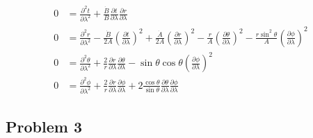 \begin{subequations}
    \begin{align}
        0 & = \frac{\partial^2 t}{\partial \lambda^2} +
        \frac{\dot{B}}{B}
        \frac{\partial t}{\partial \lambda}\frac{\partial r}{\partial \lambda}       \\
        0 & = \frac{\partial^2 r}{\partial \lambda^2} -
        \frac{\dot{B}}{2A}\left(\frac{\partial t}{\partial \lambda}\right)^2 +
        \frac{\dot{A}}{2A}\left(\frac{\partial r}{\partial \lambda}\right)^2 -
        \frac{r}{A}\left(\frac{\partial \theta}{\partial \lambda}\right)^2 -
        \frac{r\sin^2\theta}{A}\left(\frac{\partial \phi}{\partial \lambda}\right)^2 \\
        0 & = \frac{\partial^2 \theta}{\partial \lambda^2} +
        \frac{2}{r} \frac{\partial r}{\partial \lambda}\frac{\partial \theta}{\partial \lambda} -
        \sin\theta\cos\theta \left(\frac{\partial \phi}{\partial \lambda}\right)^2   \\
        0 & = \frac{\partial^2 \phi}{\partial \lambda^2} +
        \frac{2}{r} \frac{\partial r}{\partial \lambda}\frac{\partial \phi}{\partial \lambda} +
        2\frac{\cos\theta}{\sin\theta} \frac{\partial \theta}{\partial \lambda}\frac{\partial \phi}{\partial \lambda}
    \end{align}
\end{subequations}

\subsection*{Problem 3}

